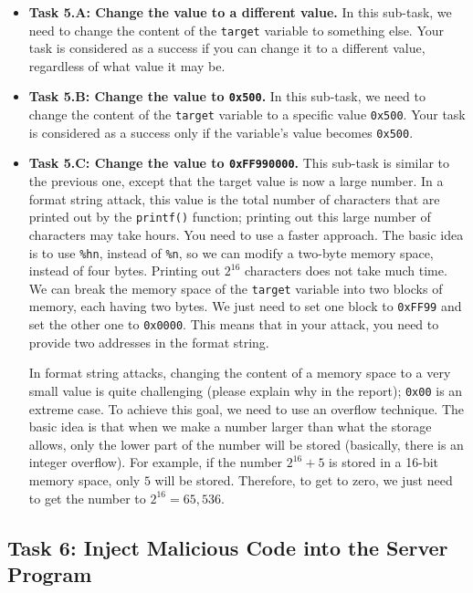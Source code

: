 \begin{itemize} 
\item \textbf{Task 5.A: Change the value to a different value.}
In this sub-task, we need to change the content of the \texttt{target} variable
to something else. Your task is considered as a success if you can change it to a
different value, regardless of what value it may be.  


\item \textbf{Task 5.B: Change the value to \texttt{0x500}.}  
In this sub-task, we need to change the content of the \texttt{target} variable
to a specific value \texttt{0x500}. Your task is considered as 
a success only if the variable's value becomes \texttt{0x500}. 


\item \textbf{Task 5.C: Change the value to \texttt{0xFF990000}.}  
This sub-task is similar to the previous one, except that the target value is 
now a large number. In a format string attack, this 
value is the total number of characters that
are printed out by the \texttt{printf()} function; printing out 
this large number of characters may take hours. You need to use a faster approach. The 
basic idea is to use \texttt{\%hn}, instead of \texttt{\%n}, so we can modify 
a two-byte memory space, instead of four bytes. Printing out
$2^{16}$ characters does not take much time. We can break the 
memory space of the \texttt{target} variable into two blocks of memory,
each having two bytes. We just need to set one block to \texttt{0xFF99}
and set the other one to \texttt{0x0000}. 
This means that in your attack, you need to provide two addresses in the
format string. 

In format string attacks, changing the content of a memory space to
a very small value is quite challenging (please explain why in the report); 
\texttt{0x00} is an extreme case. To achieve this goal, we 
need to use an overflow technique. The basic idea is that when 
we make a number larger than what the storage allows, only the lower part of the number will be
stored (basically, there is an integer overflow). 
For example, if the number $2^{16} + 5$ is stored
in a 16-bit memory space, only $5$  will be stored. Therefore, to 
get to zero, we just need to get the number to $2^{16} = 65,536$.

\end{itemize} 


\subsection{Task 6: Inject Malicious Code into the Server Program}

